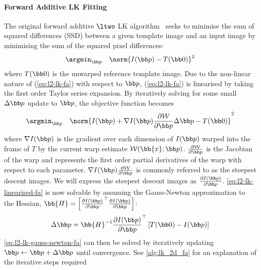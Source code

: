 \paragraph{Forward Additive LK Fitting}\label{subsubsec:lk-fa}
The original forward additive $\ltwo$ LK
algorithm~\cite{baker2004lucas,lucas1981iterative} seeks to minimise the sum of
squared differences (SSD) between a given template image and an input image by
minimising the sum of the squared pixel differences:
\begin{equation}\label{eq:l2-lk-fa}
    \argmin_{\p} \quad \norm{I(\p) - T(\zero)}^2
\end{equation}
where $T(\zero)$ is the unwarped reference template image. Due to the non-linear
nature of (\ref{eq:l2-lk-fa}) with respect to $\p$, (\ref{eq:l2-lk-fa}) is
linearised by taking the first order Taylor series expansion. By iteratively
solving for some small $\Delta \p$ update to $\p$, the objective function
becomes
\begin{equation}\label{eq:l2-lk-linearised-fa}
    \argmin_{\p} \quad \norm{I(\p) + \nabla I(\p) \frac{\partial \mathcal{W}}{\partial \p} \Delta \p - T(\zero)}^2
\end{equation}
where $\nabla I(\p)$ is the gradient over each dimension of $I(\p)$ warped into the
frame of $T$ by the current warp estimate $\mathcal{W}(\bb{x};\p)$.
$\frac{\partial \mathcal{W}}{\partial \p}$ is the Jacobian of the warp and
represents the first order partial derivatives of the warp with respect to each
parameter. $\nabla I(\p) \frac{\partial \mathcal{W}}{\partial \p}$ is commonly
referred to as the steepest descent images. We will express the steepest descent
images as $\frac{\partial I(\p)}{\partial \p}$.
\cref{eq:l2-lk-linearised-fa} is now solvable by assuming the
Gauss-Newton approximation to the Hessian,
$\bb{H} = \left[ {\frac{\partial I(\p)}{\partial \p}}^{\top} \frac{\partial I(\p)}{\partial \p} \right]$:
\begin{equation}\label{eq:l2-lk-gauss-newton-fa}
    \Delta \p = \bb{H}^{-1} \frac{\partial I(\p)}{\partial \p}^{\top} \left[ T(\zero) - I(\p) \right]
\end{equation}
\cref{eq:l2-lk-gauss-newton-fa} can then be solved by iteratively
updating $\p \leftarrow \p + \Delta \p$ until convergence.
See \cref{alg:lk_2d_fa} for an explanation of the iterative steps required
